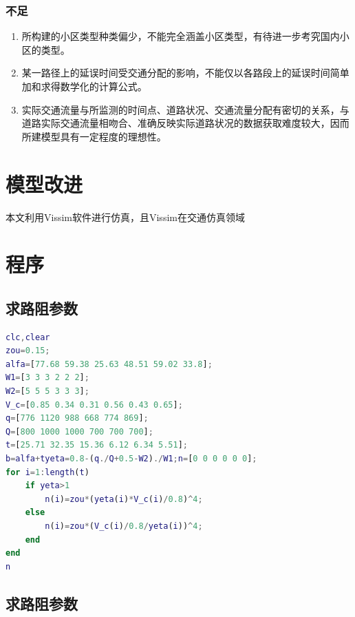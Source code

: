 \documentclass[fontset=windows,a4paper,12pt]{ctexart}
\begin{document}
	  \subsubsection{不足}
		  \begin{enumerate}
			  \item 所构建的小区类型种类偏少，不能完全涵盖小区类型，有待进一步考究国内小区的类型。
			  \item 某一路径上的延误时间受交通分配的影响，不能仅以各路段上的延误时间简单加和求得数学化的计算公式。
			  \item 实际交通流量与所监测的时间点、道路状况、交通流量分配有密切的关系，与道路实际交通流量相吻合、准确反映实际道路状况的数据获取难度较大，因而所建模型具有一定程度的理想性。
		  \end{enumerate}
	\section{模型改进}
		本文利用Vissim软件进行仿真，且Vissim在交通仿真领域
  \newpage
  
  
  \newpage
  \appendix

  \section{程序}
  \subsection{求路阻参数}
  \begin{lstlisting}[language=MATLAB] 
clc,clear
zou=0.15;
alfa=[77.68 59.38 25.63 48.51 59.02 33.8];
W1=[3 3 3 2 2 2];
W2=[5 5 5 3 3 3];
V_c=[0.85 0.34 0.31 0.56 0.43 0.65];
q=[776 1120 988 668 774 869];
Q=[800 1000 1000 700 700 700];
t=[25.71 32.35 15.36 6.12 6.34 5.51];
b=alfa+tyeta=0.8-(q./Q+0.5-W2)./W1;n=[0 0 0 0 0 0];
for i=1:length(t)
	if yeta>1
		n(i)=zou*(yeta(i)*V_c(i)/0.8)^4;
	else
		n(i)=zou*(V_c(i)/0.8/yeta(i))^4;
	end
end
n
  \end{lstlisting}
  \subsection{求路阻参数}
  \begin{lstlisting}[language=MATLAB]
  
  \end{lstlisting}
\end{document}
